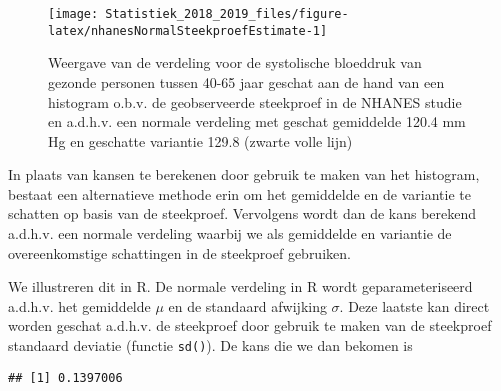 \documentclass[12pt,dutch,coursenotes]{book}
\newenvironment{Shaded}{\begin{snugshade}}{\end{snugshade}}
\newcommand{\KeywordTok}[1]{\textcolor[rgb]{0.13,0.29,0.53}{\textbf{#1}}}
\newcommand{\DataTypeTok}[1]{\textcolor[rgb]{0.13,0.29,0.53}{#1}}
\newcommand{\DecValTok}[1]{\textcolor[rgb]{0.00,0.00,0.81}{#1}}
\newcommand{\StringTok}[1]{\textcolor[rgb]{0.31,0.60,0.02}{#1}}
\newcommand{\OperatorTok}[1]{\textcolor[rgb]{0.81,0.36,0.00}{\textbf{#1}}}
\newcommand{\NormalTok}[1]{#1}
\theoremstyle{definition}
\theoremstyle{definition}
\theoremstyle{definition}
\theoremstyle{remark}
\begin{document}
\begin{figure}

{\centering \texttt{[image: Statistiek\_2018\_2019\_files/figure-latex/nhanesNormalSteekproefEstimate-1]} 

}

\caption{Weergave van de verdeling voor de systolische bloeddruk van gezonde personen tussen 40-65 jaar geschat aan de hand van een histogram o.b.v. de geobserveerde steekproef in de NHANES studie en a.d.h.v. een normale verdeling met geschat gemiddelde 120.4 mm Hg en geschatte variantie 129.8 (zwarte volle lijn)}\label{fig:nhanesNormalSteekproefEstimate}
\end{figure}

In plaats van kansen te berekenen door gebruik te maken van het
histogram, bestaat een alternatieve methode erin om het gemiddelde en de
variantie te schatten op basis van de steekproef. Vervolgens wordt dan
de kans berekend a.d.h.v. een normale verdeling waarbij we als
gemiddelde en variantie de overeenkomstige schattingen in de steekproef
gebruiken.

We illustreren dit in R. De normale verdeling in R wordt
geparameteriseerd a.d.h.v. het gemiddelde \(\mu\) en de standaard
afwijking \(\sigma\). Deze laatste kan direct worden geschat a.d.h.v. de
steekproef door gebruik te maken van de steekproef standaard deviatie
(functie \texttt{sd()}). De kans die we dan bekomen is

\begin{Shaded}
\end{Shaded}

\begin{verbatim}
## [1] 0.1397006
\end{verbatim}
\end{document}
